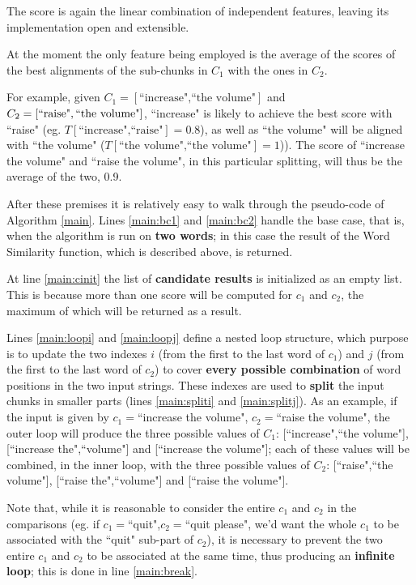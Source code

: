 \begin{itemize}
The score is again the linear combination of independent features, leaving its implementation open and extensible.

At the moment the only feature being employed is the average of the scores of the best alignments of the sub-chunks in $C_1$ with the ones in $C_2$.

For example, given $C_1=[\text{``increase",``the volume"}]$ and $C_2=[\text{``raise"},\\ \text{``the volume"}]$, ``increase" is likely to achieve the best score with ``raise" (eg. $T[\text{``increase",``raise"}]=0.8$), as well as ``the volume" will be aligned with ``the volume" ($T[\text{``the volume",``the volume"}]=1$)). The score of ``increase the volume" and ``raise the volume", in this particular splitting, will thus be the average of the two, 0.9.
\end{itemize}
After these premises it is relatively easy to walk through the pseudo-code of Algorithm \ref{main}. Lines \ref{main:bc1} and \ref{main:bc2} handle the base case, that is, when the algorithm is run on \textbf{two words}; in this case the result of the Word Similarity function, which is described above, is returned.

At line \ref{main:cinit} the list of \textbf{candidate results} is initialized as an empty list. This is because more than one score will be computed for $c_1$ and $c_2$, the maximum of which will be returned as a result.

Lines \ref{main:loopi} and \ref{main:loopj} define a nested loop structure, which purpose is to update the two indexes $i$ (from the first to the last word of $c_1$) and $j$ (from the first to the last word of $c_2$) to cover \textbf{every possible combination} of word positions in the two input strings. These indexes are used to \textbf{split} the input chunks in smaller parts (lines \ref{main:spliti} and \ref{main:splitj}). As an example, if the input is given by $c_1=$``increase the volume", $c_2=$``raise the volume", the outer loop will produce the three possible values of $C_1$: [``increase",``the volume"], [``increase the",``volume"] and [``increase the volume"]; each of these values will be combined, in the inner loop, with the three possible values of $C_2$: [``raise",``the volume"], [``raise the",``volume"] and [``raise the volume"].

Note that, while it is reasonable to consider the entire $c_1$ and $c_2$ in the comparisons (eg. if $c_1=$``quit",$c_2=$``quit please", we'd want the whole $c_1$ to be associated with the ``quit" sub-part of $c_2$), it is necessary to prevent the two entire $c_1$ and $c_2$ to be associated at the same time, thus producing an \textbf{infinite loop}; this is done in line \ref{main:break}.

